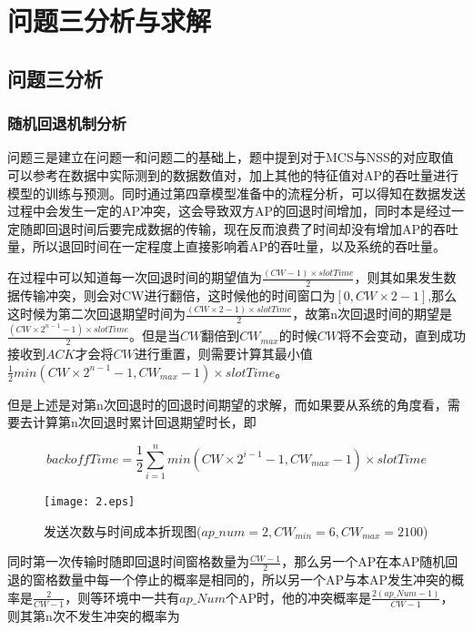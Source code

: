 \documentclass[bwprint]{gmcmthesis}
\begin{document}
\section{问题三分析与求解}
\subsection{问题三分析}
\subsubsection{随机回退机制分析}

问题三是建立在问题一和问题二的基础上，题中提到对于MCS与NSS的对应取值可以参考在数据中实际测到的数据数值对，加上其他的特征值对AP的吞吐量进行模型的训练与预测。同时通过第四章模型准备中的流程分析，可以得知在数据发送过程中会发生一定的AP冲突，这会导致双方AP的回退时间增加，同时本是经过一定随即回退时间后要完成数据的传输，现在反而浪费了时间却没有增加AP的吞吐量，所以退回时间在一定程度上直接影响着AP的吞吐量，以及系统的吞吐量。

在过程中可以知道每一次回退时间的期望值为$\frac{(CW-1)\times slotTime}{2}$，则其如果发生数据传输冲突，则会对CW进行翻倍，这时候他的时间窗口为$\left[ 0,CW\times 2-1\right] $,那么这时候为第二次回退期望时间为$\frac{(CW\times 2-1)\times slotTime}{2}$，故第n次回退时间的期望是$\frac{(CW\times 2^{n-1}-1)\times slotTime}{2}$。但是当$CW$翻倍到$CW_{max}$的时候$CW$将不会变动，直到成功接收到$ACK$才会将$CW$进行重置，则需要计算其最小值$\frac{1}{2}min(CW\times 2^{n-1}-1,CW_{max}-1)\times slotTime$。

但是上述是对第n次回退时的回退时间期望的求解，而如果要从系统的角度看，需要去计算第n次回退时累计回退期望时长，即

\begin{equation}\label{eq1}
	backoffTime=\frac{1}{2}\sum_{i=1}^{n} min(CW\times 2^{i-1}-1,CW_{max}-1)\times slotTime
\end{equation}


\begin{figure}[htbp]
	\centering
	\texttt{[image: 2.eps]}
	\caption{发送次数与时间成本折现图($ap\_num=2,CW_{min}=6,CW_{max}=2100$)}
	\label{figure2}
\end{figure}

同时第一次传输时随即回退时间窗格数量为$\frac{CW-1}{2}$，那么另一个AP在本AP随机回退的窗格数量中每一个停止的概率是相同的，所以另一个AP与本AP发生冲突的概率是$\frac{2}{CW-1}$，则等环境中一共有$ap\_Num$个AP时，他的冲突概率是$\frac{2(ap\_Num-1)}{CW-1}$，则其第n次不发生冲突的概率为
\end{document}

